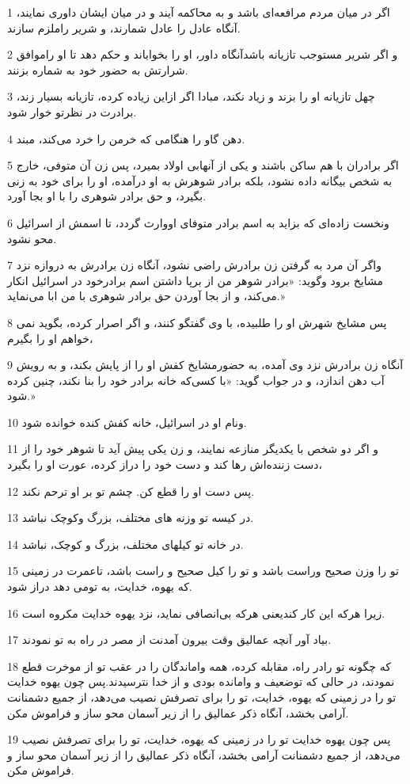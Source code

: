 \par 1 اگر در میان مردم مرافعه‌ای باشد و به محاکمه آیند و در میان ایشان داوری نمایند، آنگاه عادل را عادل شمارند، و شریر راملزم سازند.
\par 2 و اگر شریر مستوجب تازیانه باشدآنگاه داور، او را بخواباند و حکم دهد تا او راموافق شرارتش به حضور خود به شماره بزنند.
\par 3 چهل تازیانه او را بزند و زیاد نکند، مبادا اگر ازاین زیاده کرده، تازیانه بسیار زند، برادرت در نظرتو خوار شود.
\par 4 دهن گاو را هنگامی که خرمن را خرد می‌کند، مبند.
\par 5 اگر برادران با هم ساکن باشند و یکی از آنهابی اولاد بمیرد، پس زن آن متوفی، خارج به شخص بیگانه داده نشود، بلکه برادر شوهرش به او درآمده، او را برای خود به زنی بگیرد، و حق برادر شوهری را با او بجا آورد.
\par 6 ونخست زاده‌ای که بزاید به اسم برادر متوفای اووارث گردد، تا اسمش از اسرائیل محو نشود.
\par 7 واگر آن مرد به گرفتن زن برادرش راضی نشود، آنگاه زن برادرش به دروازه نزد مشایخ برود وگوید: «برادر شوهر من از برپا داشتن اسم برادرخود در اسرائیل انکار می‌کند، و از بجا آوردن حق برادر شوهری با من ابا می‌نماید.»
\par 8 پس مشایخ شهرش او را طلبیده، با وی گفتگو کنند، و اگر اصرار کرده، بگوید نمی خواهم او را بگیرم،
\par 9 آنگاه زن برادرش نزد وی آمده، به حضورمشایخ کفش او را از پایش بکند، و به رویش آب دهن اندازد، و در جواب گوید: «با کسی‌که خانه برادر خود را بنا نکند، چنین کرده شود.»
\par 10 ونام او در اسرائیل، خانه کفش کنده خوانده شود.
\par 11 و اگر دو شخص با یکدیگر منازعه نمایند، و زن یکی پیش آید تا شوهر خود را از دست زننده‌اش رها کند و دست خود را دراز کرده، عورت او را بگیرد،
\par 12 پس دست او را قطع کن. چشم تو بر او ترحم نکند.
\par 13 در کیسه تو وزنه های مختلف، بزرگ وکوچک نباشد.
\par 14 در خانه تو کیلهای مختلف، بزرگ و کوچک، نباشد.
\par 15 تو را وزن صحیح وراست باشد و تو را کیل صحیح و راست باشد، تاعمرت در زمینی که یهوه، خدایت، به تومی دهد دراز شود.
\par 16 زیرا هر‌که این کار کندیعنی هر‌که بی‌انصافی نماید، نزد یهوه خدایت مکروه است.
\par 17 بیاد آور آنچه عمالیق وقت بیرون آمدنت از مصر در راه به تو نمودند.
\par 18 که چگونه تو رادر راه، مقابله کرده، همه واماندگان را در عقب تو از موخرت قطع نمودند، در حالی که توضعیف و وامانده بودی و از خدا نترسیدند.پس چون یهوه خدایت تو را در زمینی که یهوه، خدایت، تو را برای تصرفش نصیب می‌دهد، از جمیع دشمنانت آرامی بخشد، آنگاه ذکر عمالیق را از زیر آسمان محو ساز و فراموش مکن.
\par 19 پس چون یهوه خدایت تو را در زمینی که یهوه، خدایت، تو را برای تصرفش نصیب می‌دهد، از جمیع دشمنانت آرامی بخشد، آنگاه ذکر عمالیق را از زیر آسمان محو ساز و فراموش مکن.
 
